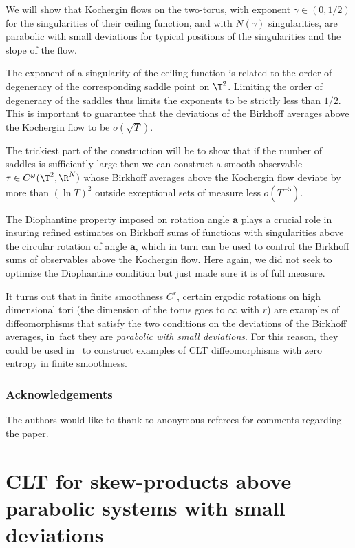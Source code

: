 \documentclass[10pt]{amsart}
\newcommand\ba{\boldsymbol{a}}
\theoremstyle{definition}
\theoremstyle{plain}
\begin{document}
We will show that Kochergin flows on the two-torus, with exponent $\gamma\in (0,1/2)$ for the singularities of their ceiling function, and with $N(\gamma)$ singularities, are parabolic with small deviations for typical positions of the singularities and the slope of the flow.

The exponent of a singularity of the ceiling function is related to the order of degeneracy of the corresponding saddle point on $\T^2$. Limiting the order of degeneracy of the saddles thus limits the exponents to be strictly less than $1/2$. This is important to guarantee that the deviations of the Birkhoff averages above the Kochergin flow to be $o(\sqrt{T})$.

The trickiest part of the construction will be to show that if the number of saddles is sufficiently large then we can construct a smooth observable $\tau\in C^\omega(\T^2,\R^{N})$ whose Birkhoff averages above the Kochergin flow deviate by more than $(\ln T)^2$ outside exceptional sets of measure less $o(T^{-5})$.

The Diophantine property imposed on rotation angle
$\ba$ plays a crucial role in insuring refined estimates on Birkhoff sums of functions with singularities above the circular rotation of angle $\ba$, which in turn can be used to control the Birkhoff sums of observables above the Kochergin flow. Here again, we did not seek to optimize the Diophantine condition but just made sure it is of full measure.

It turns out that in finite smoothness $C^r$, certain ergodic rotations on high dimensional tori (the dimension of the torus goes to $\infty$ with $r$) are examples of diffeomorphisms that satisfy the two conditions on the deviations of the Birkhoff averages, in~fact they are \emph{parabolic with small deviations}. For this reason, they could be used in~\cite{DDKN} to construct examples of CLT diffeomorphisms with zero entropy in finite smoothness.

\subsubsection*{Acknowledgements}
The authors would like to thank to anonymous referees for comments regarding the paper.

\section{CLT for skew-products above parabolic systems with small deviations}
\label{ScCLT-Par}
\end{document}
